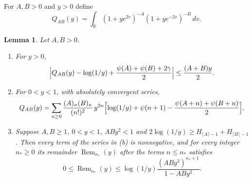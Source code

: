 \documentclass[11pt]{amsart}
\numberwithin{equation}{section}
\newtheorem{lemma}[equation]{Lemma}
\theoremstyle{definition}
\theoremstyle{remark}
\newcommand{\R}{\mathbb R}
\begin{document}
For $A,B>0$ and $y>0$ define
\[
 Q_{AB}(y)=\int_\R(1+ye^{2v})^{-A}(1+ye^{-2v})^{-B}\,dv .
\]

\begin{lemma}\label{pf:hyperbola}
Let $A,B>0$.
\begin{enumerate}
\item[(a)] For $y>0$,
\begin{equation}\label{pf:elementary-hyperbola-error}
 \Bigl|Q_{AB}(y)-\log(1/y)+\frac{\psi(A)+\psi(B)+2\gamma}{2}\Bigr|
 \le\frac{(A+B)y}2 .
\end{equation}
\item[(b)] For $0<y<1$, with absolutely convergent series,
\[
 Q_{AB}(y)=\sum_{n\ge0}\frac{(A)_n(B)_n}{(n!)^2}\,y^{2n}
 \Bigl[\log(1/y)+\psi(n+1)-\frac{\psi(A+n)+\psi(B+n)}2\Bigr].
\]
\item[(c)] Suppose $A,B\ge1$, $0<y<1$, $ABy^2<1$ and
$2\log(1/y)\ge H_{\lceil A\rceil-1}+H_{\lceil B\rceil-1}$. Then every
term of the series in (b) is nonnegative, and for every integer
$n_*\ge0$ its remainder $\operatorname{Rem}_{n_*}(y)$ after the terms $n\le n_*$
satisfies
\[
 0\le\operatorname{Rem}_{n_*}(y)\le\log(1/y)\frac{(ABy^2)^{n_*+1}}{1-ABy^2}.
\]
\end{enumerate}
\end{lemma}
\end{document}
